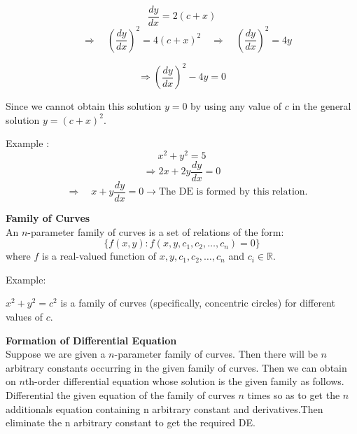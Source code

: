 \documentclass[a4aper,12pt]{report}
\begin{document}
\[
\frac{dy}{dx} = 2(c + x)\]
\[
\quad \Rightarrow \quad \left( \frac{dy}{dx} \right)^2 = 4(c + x)^2
\quad \Rightarrow \quad \left( \frac{dy}{dx} \right)^2 = 4y
\]

\[
\Rightarrow \left( \frac{dy}{dx} \right)^2 - 4y = 0
\]

Since we cannot obtain this solution \( y = 0 \) by using any value of \( c \) in the general solution \( y = (c + x)^2 \).

\begin{tcolorbox}[breakable, title = {\textbf{Example : }}]
    
\end{tcolorbox}
\vspace{1em}
 Example :
\[
x^2 + y^2 = 5
\]
\[
\Rightarrow 2x + 2y \frac{dy}{dx} = 0
\]
\[
\quad \Rightarrow \boxed{\quad x + y \frac{dy}{dx} = 0 } \longrightarrow \text{The DE is formed by this relation.}
\]

\vspace{1em}
\noindent\textbf{ Family of Curves} \\ [5pt]

An \( n \)-parameter family of curves is a set of relations of the form:
\[
\{f(x,y) : f(x, y, c_1, c_2, \ldots, c_n) = 0\}
\]
 where \( f \) is a real-valued function of  \(x, y, c_1, c_2, \ldots, c_n\) and \( c_i \in \mathbb{R} \).
\begin{tcolorbox}[breakable, title = {\textbf{Example : }}]
    
\end{tcolorbox}
Example:
\par $x^2 + y^2 = c^2$ is a family of curves (specifically, concentric circles) for different values of \( c \). 
\begin{center}
\end{center}
\noindent \textbf{Formation of Differential Equation} \\ [5pt]
Suppose we are given a \( n \)-parameter family of curves. Then there will be \( n \) arbitrary constants occurring in the given family of curves. Then we can obtain on \( n \)th-order differential equation whose solution is the given family as follows. \\ [5pt]
Differential the given equation of the family of curves \( n \) times so as to get the \( n \) additionals equation containing n arbitrary constant and derivatives.Then eliminate the n arbitrary constant to get the required DE.
\end{document}
